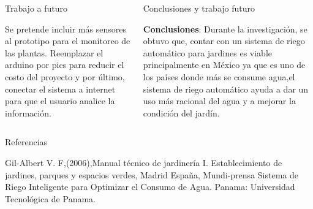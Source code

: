 \documentclass{beamer}
\begin{document}
\begin{frame}[fragile]{}
\begin{columns}[t]
  
  \begin{column}{0.46\linewidth}
  	\begin{block}{Trabajo a futuro}
  		\begin{minipage}[t]{1\textwidth}
  			\vspace{0pt}
 Se pretende incluir más sensores al prototipo para el monitoreo de las plantas. Reemplazar el arduino por pics para reducir el costo del proyecto y por último, conectar el sistema a internet para que el usuario analice la información.
  		\end{minipage} 
  	\end{block}
  \end{column}

	     \begin{column}{0.46\linewidth}
	     	\begin{block}{Conclusiones y trabajo futuro}\justifying
	     		\begin{minipage}[t]{0.96\textwidth}
	     			\textbf{Conclusiones}: 
	     			Durante la investigación, se obtuvo que, contar con un sistema de riego automático para jardines es viable principalmente en México ya que es uno de los países donde más se consume agua,el sistema de riego automático ayuda a dar un uso más racional del agua y a mejorar la condición del jardín.
	     			\\
	     			
	     		\end{minipage}
	     		
	     	\end{block}   
	     \end{column}
\end{columns}

\justifying
\begin{columns}[t]
 \begin{column}{0.96\linewidth}
      \begin{block}{Referencias}
	\begin{minipage}[t]{0.71\textwidth}
        \begin{small}
        \begin{thebibliography}{widestlabel}
        	 Gil-Albert V. F,(2006),Manual técnico de jardinería I. Establecimiento de jardines,
parques y espacios verdes, Madrid España, Mundi-prensa
        	 Sistema de Riego Inteligente para Optimizar el Consumo de
Agua. Panama: Universidad Tecnológica de Panama.


\end{thebibliography}
\end{small}
\end{minipage}
\end{block}
\end{column}
\end{columns}
\end{frame}
\end{document}
